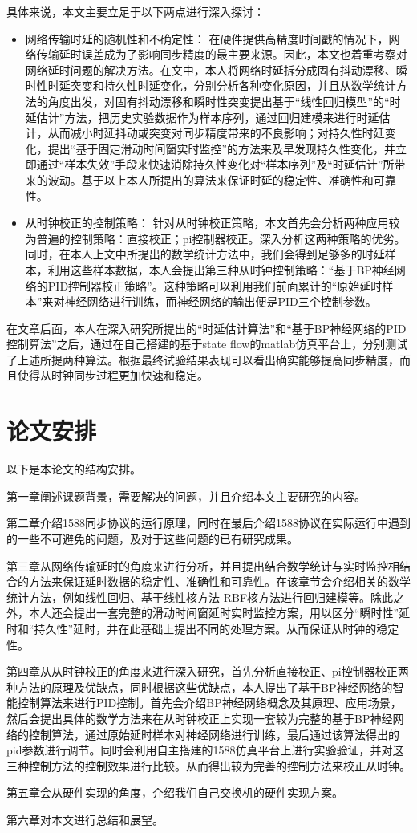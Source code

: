 具体来说，本文主要立足于以下两点进行深入探讨：
\begin{itemize}[noitemsep,topsep=0pt,parsep=0pt,partopsep=0pt]
	\item 网络传输时延的随机性和不确定性：
在硬件提供高精度时间戳的情况下，网络传输延时误差成为了影响同步精度的最主要来源。因此，本文也着重考察对网络延时问题的解决方法。在文中，本人将网络时延拆分成固有抖动漂移、瞬时性时延突变和持久性时延变化，分别分析各种变化原因，并且从数学统计方法的角度出发，对固有抖动漂移和瞬时性突变提出基于“线性回归模型”的“时延估计”方法，把历史实验数据作为样本序列，通过回归建模来进行时延估计，从而减小时延抖动或突变对同步精度带来的不良影响；对持久性时延变化，提出“基于固定滑动时间窗实时监控”的方法来及早发现持久性变化，并立即通过“样本失效”手段来快速消除持久性变化对“样本序列”及“时延估计”所带来的波动。基于以上本人所提出的算法来保证时延的稳定性、准确性和可靠性。
	\item 从时钟校正的控制策略：
针对从时钟校正策略，本文首先会分析两种应用较为普遍的控制策略：直接校正；pi控制器校正。深入分析这两种策略的优劣。同时，在本人上文中所提出的数学统计方法中，我们会得到足够多的时延样本，利用这些样本数据，本人会提出第三种从时钟控制策略：“基于BP神经网络的PID控制器校正策略”。这种策略可以利用我们前面累计的“原始延时样本”来对神经网络进行训练，而神经网络的输出便是PID三个控制参数。
\end{itemize}

在文章后面，本人在深入研究所提出的“时延估计算法”和“基于BP神经网络的PID控制算法”之后，通过在自己搭建的基于state flow的matlab仿真平台上，分别测试了上述所提两种算法。根据最终试验结果表现可以看出确实能够提高同步精度，而且使得从时钟同步过程更加快速和稳定。

\section{论文安排}
以下是本论文的结构安排。

第一章阐述课题背景，需要解决的问题，并且介绍本文主要研究的内容。

第二章介绍1588同步协议的运行原理，同时在最后介绍1588协议在实际运行中遇到的一些不可避免的问题，及对于这些问题的已有研究成果。

第三章从网络传输延时的角度来进行分析，并且提出结合数学统计与实时监控相结合的方法来保证延时数据的稳定性、准确性和可靠性。在该章节会介绍相关的数学统计方法，例如线性回归、基于线性核方法 RBF核方法进行回归建模等。除此之外，本人还会提出一套完整的滑动时间窗延时实时监控方案，用以区分“瞬时性”延时和“持久性”延时，并在此基础上提出不同的处理方案。从而保证从时钟的稳定性。

第四章从从时钟校正的角度来进行深入研究，首先分析直接校正、pi控制器校正两种方法的原理及优缺点，同时根据这些优缺点，本人提出了基于BP神经网络的智能控制算法来进行PID控制。首先会介绍BP神经网络概念及其原理、应用场景，然后会提出具体的数学方法来在从时钟校正上实现一套较为完整的基于BP神经网络的控制算法，通过原始延时样本对神经网络进行训练，最后通过该算法得出的pid参数进行调节。同时会利用自主搭建的1588仿真平台上进行实验验证，并对这三种控制方法的控制效果进行比较。从而得出较为完善的控制方法来校正从时钟。

第五章会从硬件实现的角度，介绍我们自己交换机的硬件实现方案。

第六章对本文进行总结和展望。

